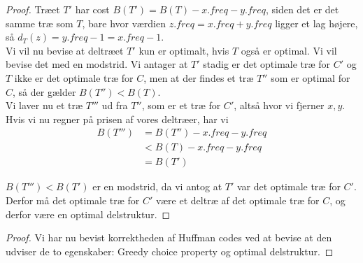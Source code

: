\begin{proof}
Træet $T'$ har cost $B(T') = B(T) - x.freq - y.freq$, siden det er det samme træ som $T$, bare hvor værdien $z.freq = x.freq + y.freq$ ligger et lag højere, så $d_T(z) = y.freq - 1 = x.freq - 1$.\\

Vi vil nu bevise at deltræet $T'$ kun er optimalt, hvis $T$ også er optimal. Vi vil bevise det med en modstrid. Vi antager at $T'$ stadig er det optimale træ for $C'$ og $T$ ikke er det optimale træ for $C$, men at der findes et træ $T''$ som er optimal for $C$, så der gælder $B(T'') < B(T)$.\\

Vi laver nu et træ $T'''$ ud fra $T''$, som er et træ for $C'$, altså hvor vi fjerner $x,y$. Hvis vi nu regner på prisen af vores deltræer, har vi
\begin{align*}
    B(T''') &= B(T'') - x.freq - y.freq\\
    &< B(T) - x.freq - y.freq\\
    &= B(T')
\end{align*}

$B(T''') < B(T')$ er en modstrid, da vi antog at $T'$ var det optimale træ for $C'$. Derfor må det optimale træ for $C'$ være et deltræ af det optimale træ for $C$, og derfor være en optimal delstruktur.
\end{proof}

\begin{proof}
Vi har nu bevist korrektheden af Huffman codes ved at bevise at den udviser de to egenskaber: Greedy choice property og optimal delstruktur.
\end{proof}

